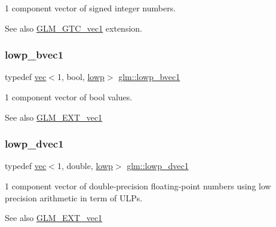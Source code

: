 1 component vector of signed integer numbers. \begin{DoxySeeAlso}{See also}
\mbox{\hyperlink{group__gtc__vec1}{G\+L\+M\+\_\+\+G\+T\+C\+\_\+vec1}} extension. 
\end{DoxySeeAlso}
\mbox{\label{group__ext__vec1_ga861bf958322f2909514b1256be428490}} 
\subsubsection{\texorpdfstring{lowp\+\_\+bvec1}{lowp\_bvec1}}
{\footnotesize\ttfamily typedef \mbox{\hyperlink{structglm_1_1vec}{vec}}$<$1, bool, \mbox{\hyperlink{namespaceglm_a36ed105b07c7746804d7fdc7cc90ff25ae161af3fc695e696ce3bf69f7332bc2d}{lowp}}$>$ \mbox{\hyperlink{group__ext__vec1_ga861bf958322f2909514b1256be428490}{glm\+::lowp\+\_\+bvec1}}}

1 component vector of bool values.

\begin{DoxySeeAlso}{See also}
\mbox{\hyperlink{group__ext__vec1}{G\+L\+M\+\_\+\+E\+X\+T\+\_\+vec1}} 
\end{DoxySeeAlso}
\mbox{\label{group__ext__vec1_ga4fa455d945a1e3e591689464c0f9090f}} 
\subsubsection{\texorpdfstring{lowp\+\_\+dvec1}{lowp\_dvec1}}
{\footnotesize\ttfamily typedef \mbox{\hyperlink{structglm_1_1vec}{vec}}$<$1, double, \mbox{\hyperlink{namespaceglm_a36ed105b07c7746804d7fdc7cc90ff25ae161af3fc695e696ce3bf69f7332bc2d}{lowp}}$>$ \mbox{\hyperlink{group__ext__vec1_ga4fa455d945a1e3e591689464c0f9090f}{glm\+::lowp\+\_\+dvec1}}}

1 component vector of double-\/precision floating-\/point numbers using low precision arithmetic in term of U\+L\+Ps.

\begin{DoxySeeAlso}{See also}
\mbox{\hyperlink{group__ext__vec1}{G\+L\+M\+\_\+\+E\+X\+T\+\_\+vec1}} 
\end{DoxySeeAlso}
\mbox{\label{group__ext__vec1_ga46adb8a3dcf2312c343a093c3bf372d7}} 
